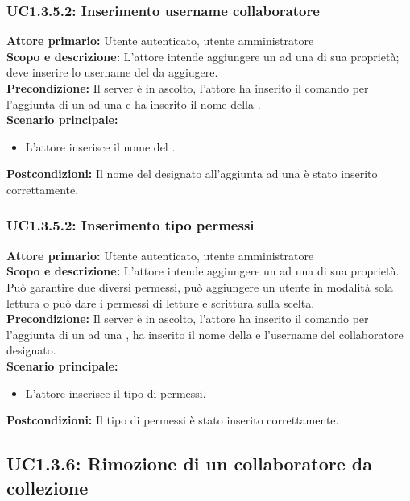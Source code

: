 \documentclass{scalatekids-article}
\begin{document}
\subsubsection{UC1.3.5.2: Inserimento username collaboratore}

\textbf{Attore primario:} Utente autenticato, utente amministratore\\
\textbf{Scopo e descrizione:} L'attore intende aggiungere un  ad una  di sua proprietà; deve inserire lo username del  da aggiugere.\\
\textbf{Precondizione:} Il server è in ascolto, l'attore ha inserito il comando per l'aggiunta di un  ad una  e ha inserito il nome della .\\
\textbf{Scenario principale:}
\begin{itemize}
\item L'attore inserisce il nome del .
\end{itemize}
\textbf{Postcondizioni:} Il nome del  designato all'aggiunta ad una  è stato inserito correttamente.

\subsubsection{UC1.3.5.2: Inserimento tipo permessi}

\textbf{Attore primario:} Utente autenticato, utente amministratore\\
\textbf{Scopo e descrizione:} L'attore intende aggiungere un  ad una  di sua proprietà. Può garantire due diversi permessi, può aggiungere un utente in modalità sola lettura o può dare i permessi di letture e scrittura sulla  scelta.\\
\textbf{Precondizione:} Il server è in ascolto, l'attore ha inserito il comando per l'aggiunta di un  ad una , ha inserito il nome della  e l'username del collaboratore designato.\\
\textbf{Scenario principale:}
\begin{itemize}
\item L'attore inserisce il tipo di permessi.
\end{itemize}
\textbf{Postcondizioni:} Il tipo di permessi è stato inserito correttamente.

\subsection{UC1.3.6: Rimozione di un collaboratore da collezione}
\end{document}
